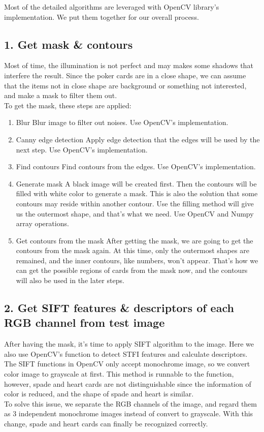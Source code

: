 \documentclass{article}
\begin{document}
Most of the detailed algorithms are leveraged with OpenCV library's implementation. We put them together for our overall process.

\subsection*{1. Get mask \& contours}

Most of time, the illumination is not perfect and may makes some shadows that interfere the result. Since the poker cards are in a close shape, we can assume that the items not in close shape are background or something not interested, and make a mask to filter them out.\\
To get the mask, these steps are applied:
\begin{enumerate}
    \item Blur
        \subitem Blur image to filter out noises. Use OpenCV's implementation.
    \item Canny edge detection
        \subitem Apply edge detection that the edges will be used by the next step. Use OpenCV's implementation.
    \item Find contours
        \subitem Find contours from the edges. Use OpenCV's implementation.
    \item Generate mask
        \subitem A black image will be created first. Then the contours will be filled with white color to generate a mask. This is also the solution that some contours may reside within another contour. Use the filling method will give us the outermost shape, and that's what we need. Use OpenCV and Numpy array operations.
    \item Get contours from the mask
        \subitem After getting the mask, we are going to get the contours from the mask again. At this time, only the outermost shapes are remained, and the inner contours, like numbers, won't appear. That's how we can get the possible regions of cards from the mask now, and the contours will also be used in the later steps.
\end{enumerate}

\subsection*{2. Get SIFT features \& descriptors of each RGB channel from test image}

After having the mask, it's time to apply SIFT algorithm to the image. Here we also use OpenCV's function to detect STFI features and calculate descriptors.\\
The SIFT functions in OpenCV only accept monochrome image, so we convert color image to grayscale at first. This method is runnable to the function, however, spade and heart cards are not distinguishable since the information of color is reduced, and the shape of spade and heart is similar.\\
To solve this issue, we separate the RGB channels of the image, and regard them as 3 independent monochrome images instead of convert to grayscale. With this change, spade and heart cards can finally be recognized correctly.
\end{document}

